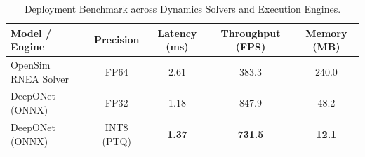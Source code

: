 
\begin{table}[h]
\centering
\caption{Deployment Benchmark across Dynamics Solvers and Execution Engines.}
\label{tab:deployment_benchmark}
\begin{tabular}{lcccc}
\hline
\textbf{Model / Engine} & \textbf{Precision} & \textbf{Latency (ms)} & \textbf{Throughput (FPS)} & \textbf{Memory (MB)} \\ \hline
OpenSim RNEA Solver     & FP64               & 2.61 & 383.3 & 240.0 \\
DeepONet (ONNX)         & FP32               & 1.18 & 847.9 & 48.2 \\
DeepONet (ONNX)         & INT8 (PTQ)         & \textbf{1.37} & \textbf{731.5} & \textbf{12.1} \\ \hline
\end{tabular}
\end{table}
